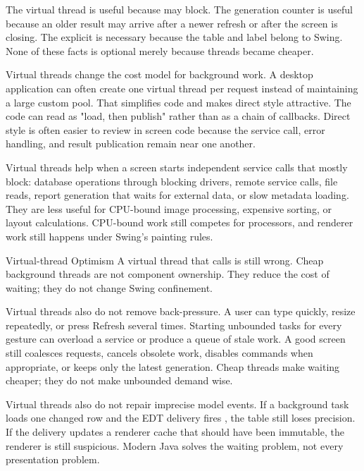 The virtual thread is useful because  may block. The generation counter is useful because an older result may arrive after a newer refresh or after the screen is closing. The explicit  is necessary because the table and label belong to Swing. None of these facts is optional merely because threads became cheaper.

Virtual threads change the cost model for background work. A desktop application can often create one virtual thread per request instead of maintaining a large custom pool. That simplifies code and makes direct style attractive. The code can read as "load, then publish" rather than as a chain of callbacks. Direct style is often easier to review in screen code because the service call, error handling, and result publication remain near one another.

Virtual threads help when a screen starts independent service calls that mostly block: database operations through blocking drivers, remote service calls, file reads, report generation that waits for external data, or slow metadata loading. They are less useful for CPU-bound image processing, expensive sorting, or layout calculations. CPU-bound work still competes for processors, and renderer work still happens under Swing's painting rules.

\begin{pitfallbox}{Virtual-thread Optimism}
A virtual thread that calls  is still wrong. Cheap background threads are not component ownership. They reduce the cost of waiting; they do not change Swing confinement.
\end{pitfallbox}

Virtual threads also do not remove back-pressure. A user can type quickly, resize repeatedly, or press Refresh several times. Starting unbounded tasks for every gesture can overload a service or produce a queue of stale work. A good screen still coalesces requests, cancels obsolete work, disables commands when appropriate, or keeps only the latest generation. Cheap threads make waiting cheaper; they do not make unbounded demand wise.

Virtual threads also do not repair imprecise model events. If a background task loads one changed row and the EDT delivery fires , the table still loses precision. If the delivery updates a renderer cache that should have been immutable, the renderer is still suspicious. Modern Java solves the waiting problem, not every presentation problem.


